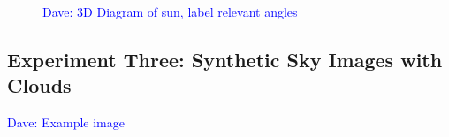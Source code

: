 \documentclass[11pt]{article}
\newcommand{\dnote}[1]{\textcolor{blue}{Dave: #1}}
\begin{document}
\begin{figure}
\begin{center}
\hspace{5mm}
\caption{\dnote{3D Diagram of sun, label relevant angles}}
\end{center}
\end{figure}

\subsection{Experiment Three: Synthetic Sky Images with Clouds}

\dnote{Example image}
\end{document}
